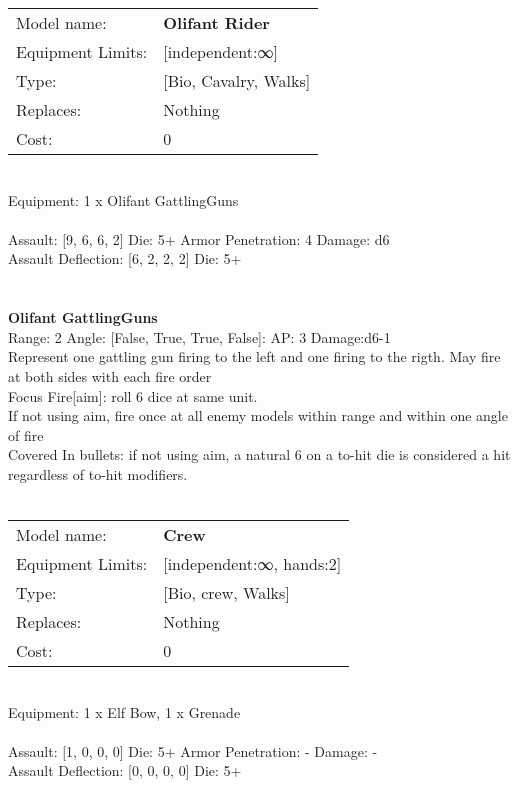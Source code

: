 \noindent
\begin{tabular}{ll}
Model name: &{\bf Olifant Rider } \\
Equipment Limits: &[independent:∞] \\
Type: &[Bio, Cavalry, Walks] \\
Replaces: &Nothing \\
Cost: & 0\\
\end{tabular}
\ \\
Equipment: 1 x Olifant GattlingGuns \\
\ \\
Assault: [9, 6, 6, 2] Die: 5+ Armor Penetration: 4 Damage: d6 \\
Assault Deflection: [6, 2, 2, 2] Die: 5+\\
\indent  
\ \\

\ \\
{\bf Olifant GattlingGuns } \\



Range: 2  Angle: [False, True, True, False]: AP: 3 Damage:d6-1 \\
Represent one gattling gun firing to the left and one firing to the rigth. May fire at both sides with each fire order\\ 
Focus Fire[aim]: roll 6 dice at same unit.\\ 
If not using aim, fire once at all enemy models within range and within one angle of fire\\ 
Covered In bullets: if not using aim, a natural 6 on a to-hit die is considered a hit regardless of to-hit modifiers.\\ 




 
\ \\

\noindent
\begin{tabular}{ll}
Model name: &{\bf Crew } \\
Equipment Limits: &[independent:∞, hands:2] \\
Type: &[Bio, crew, Walks] \\
Replaces: &Nothing \\
Cost: & 0\\
\end{tabular}
\ \\
Equipment: 1 x Elf Bow, 1 x Grenade \\
\ \\
Assault: [1, 0, 0, 0] Die: 5+ Armor Penetration: - Damage: - \\
Assault Deflection: [0, 0, 0, 0] Die: 5+\\
\indent  
\ \\

